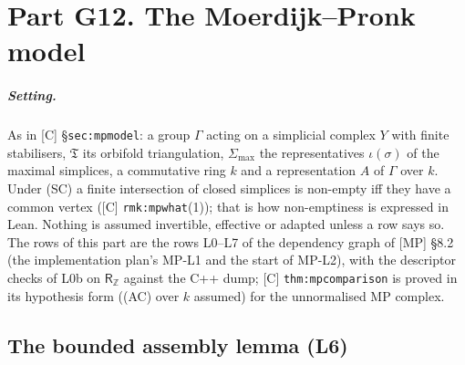 
\chapter{Part G12. The Moerdijk--Pronk model}\label{ch:mp}

\paragraph{Setting.} As in [C] \S\texttt{sec:mpmodel}: a group $\Gamma$ acting on a simplicial complex $Y$ with finite
stabilisers, $\mathfrak T$ its orbifold triangulation, $\Sigma_{\max}$ the representatives $\iota(\sigma)$ of the maximal
simplices, a commutative ring $k$ and a representation $A$ of $\Gamma$ over $k$.  Under (SC) a finite intersection of closed
simplices is non-empty iff they have a common vertex ([C] \texttt{rmk:mpwhat}(1)); that is how non-emptiness is expressed in
Lean.  Nothing is assumed invertible, effective or adapted unless a row says so.  The rows of this part are the rows
L0--L7 of the dependency graph of [MP] \S8.2 (the implementation plan's MP-L1 and the start of MP-L2), with the descriptor
checks of L0b on $\mathsf R_{\mathbb Z}$ against the C++ dump; [C] \texttt{thm:mpcomparison} is proved in its hypothesis form
((AC) over $k$ assumed) for the unnormalised MP complex.

\section{The bounded assembly lemma (L6)}

